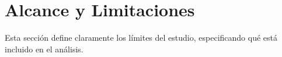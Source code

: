 \section{Alcance y Limitaciones}

Esta sección define claramente los límites del estudio, especificando qué está incluido en el análisis.